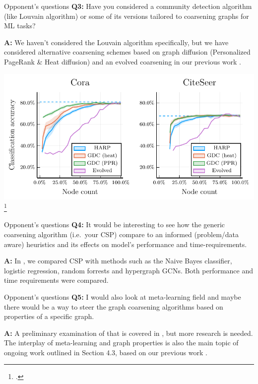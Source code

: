 \documentclass[10pt]{beamer}
\begin{document}
\begin{frame}{Opponent's questions}
	\textbf{Q3:} Have you considered a community detection algorithm (like Louvain algorithm) or some of its versions tailored to coarsening graphs for ML tasks?

	\textbf{A:} We haven't considered the Louvain algorithm specifically, but we have considered alternative coarsening schemes based on graph diffusion (Personalized PageRank \& Heat diffusion) and an evolved coarsening in our previous work \cite{dedic_adaptive_2022}.

	\centering
	\includegraphics[width=0.7\pagewidth]{images/alternative-coarsening-algorithms/alternative-coarsening-algorithms.pdf}\footcite{dedic_adaptive_2022}
\end{frame}

\begin{frame}{Opponent's questions}
	\textbf{Q4:} It would be interesting to see how the generic coarsening algorithm (i.e.\ your CSP) compare to an informed (problem/data aware) heuristics and its effects on model’s performance and time-requirements.

	\textbf{A:} In \cite{prochazka_convolutional_2024}, we compared CSP with methods such as the Naive Bayes classifier, logistic regression, random forrests and hypergraph GCNs. Both performance and time requirements were compared.
\end{frame}

\begin{frame}{Opponent's questions}
	\textbf{Q5:} I would also look at meta-learning field and maybe there would be a way to steer the graph coarsening algorithms based on properties of a specific graph.

	\textbf{A:} A preliminary examination of that is covered in \cite{prochazka_scalable_2022}, but more research is needed. The interplay of meta-learning and graph properties is also the main topic of ongoing work outlined in Section 4.3, based on our previous work \cite{prochazka_which_2023}.
\end{frame}
\end{document}
